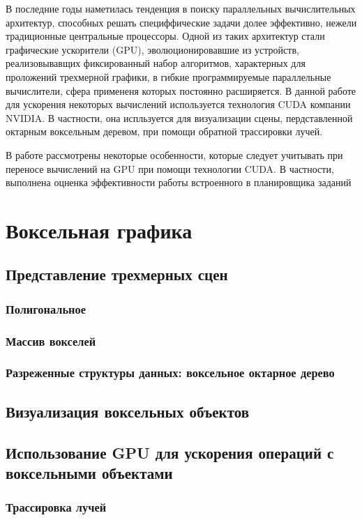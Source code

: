 \documentclass[a4paper,14pt]{extreport}
\begin{document}
В последние годы наметилась тенденция в поиску параллельных вычислительных архитектур, способных решать специффические задачи долее эффективно, нежели традиционные центральные процессоры. Одной из таких архитектур стали графические ускорители (GPU), эволюционировавшие из устройств, реализовывавщих фиксированный набор алгоритмов, характерных для проложений трехмерной графики, в гибкие программируемые параллельные вычислители, сфера примененя которых постоянно расширяется. В данной работе для ускорения некоторых вычислений используется технология CUDA компании NVIDIA. В частности, она испльзуется для визуализации сцены, пердставленной октарным воксельным деревом, при помощи обратной трассировки лучей.

В работе рассмотрены некоторые особенности, которые следует учитывать при переносе вычислений на GPU при помощи технологии CUDA. В частности, выполнена оцненка эффективности работы встроенного в планировщика заданий

\chapter{Воксельная графика}
\section{Представление трехмерных сцен}
\subsection{Полигональное}
\subsection{Массив вокселей}
\subsection{Разреженные структуры данных: воксельное октарное дерево}
\section{Визуализация воксельных объектов}



\section{Использование GPU для ускорения операций с воксельными объектами}
\subsection{Трассировка лучей}
\end{document}
